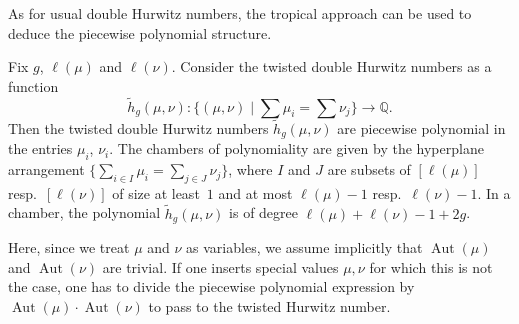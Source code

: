 \documentclass[ALCO,published]{cedram}
\DeclareMathOperator{\Aut}{Aut}
\begin{document}
As for usual double Hurwitz numbers, the tropical approach can be used to deduce the piecewise polynomial structure.

\begin{theo}\label{thm-PP}
Fix $g$, $\ell(\mu)$ and $\ell(\nu)$. Consider the twisted double Hurwitz numbers as a function 
$$\tilde{h}_g(\mu,\nu):\Big\{(\mu,\nu) \mid \sum \mu_i=\sum\nu_j\Big\} \longrightarrow\mathbb{Q}.$$ 
Then the twisted double Hurwitz numbers $\tilde{h}_g(\mu,\nu)$ are piecewise polynomial in the entries $\mu_i$, $\nu_i$. 
The chambers of polynomiality are given by the hyperplane arrangement $\{\sum_{i\in I}\mu_i=\sum_{j\in J}\nu_j\}$, where $I$ and $J$ are subsets of $[\ell(\mu)]$ resp.\ $[\ell(\nu)]$ of size at least~$1$ and at most $\ell(\mu)-1$ resp.\ $\ell(\nu)-1$.
In a chamber, the polynomial $\tilde{h}_g(\mu,\nu)$ is of degree $\ell(\mu)+\ell(\nu)-1+2g$. 
\end{theo}

Here, since we treat $\mu$ and $\nu$ as variables, we assume implicitly that $\Aut(\mu)$ and $\Aut(\nu)$ are trivial. If one inserts special values $\mu,\nu$ for which this is not the case, one has to divide the piecewise polynomial expression by $\Aut(\mu)\cdot \Aut(\nu)$ to pass to the twisted Hurwitz number.
\end{document}
